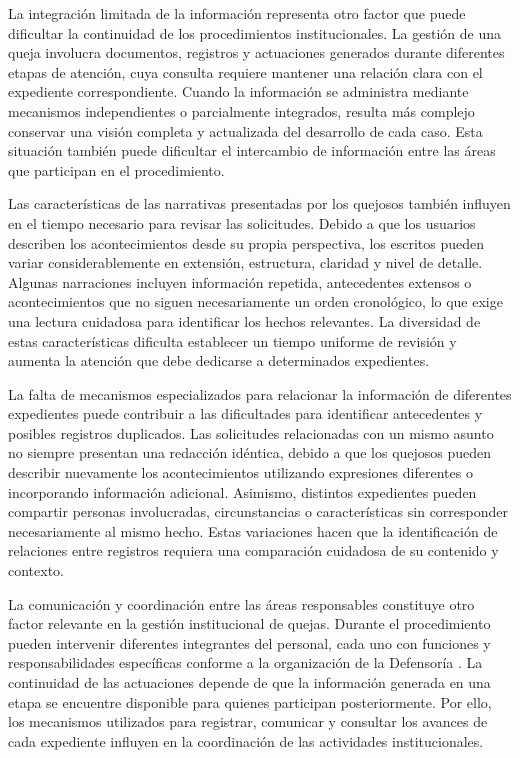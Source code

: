 	La integración limitada de la información representa otro factor que puede dificultar la continuidad de los procedimientos institucionales. La gestión de una queja involucra documentos, registros y actuaciones generados durante diferentes etapas de atención, cuya consulta requiere mantener una relación clara con el expediente correspondiente. Cuando la información se administra mediante mecanismos independientes o parcialmente integrados, resulta más complejo conservar una visión completa y actualizada del desarrollo de cada caso. Esta situación también puede dificultar el intercambio de información entre las áreas que participan en el procedimiento.

	Las características de las narrativas presentadas por los quejosos también influyen en el tiempo necesario para revisar las solicitudes. Debido a que los usuarios describen los acontecimientos desde su propia perspectiva, los escritos pueden variar considerablemente en extensión, estructura, claridad y nivel de detalle. Algunas narraciones incluyen información repetida, antecedentes extensos o acontecimientos que no siguen necesariamente un orden cronológico, lo que exige una lectura cuidadosa para identificar los hechos relevantes. La diversidad de estas características dificulta establecer un tiempo uniforme de revisión y aumenta la atención que debe dedicarse a determinados expedientes.

	La falta de mecanismos especializados para relacionar la información de diferentes expedientes puede contribuir a las dificultades para identificar antecedentes y posibles registros duplicados. Las solicitudes relacionadas con un mismo asunto no siempre presentan una redacción idéntica, debido a que los quejosos pueden describir nuevamente los acontecimientos utilizando expresiones diferentes o incorporando información adicional. Asimismo, distintos expedientes pueden compartir personas involucradas, circunstancias o características sin corresponder necesariamente al mismo hecho. Estas variaciones hacen que la identificación de relaciones entre registros requiera una comparación cuidadosa de su contenido y contexto.

	La comunicación y coordinación entre las áreas responsables constituye otro factor relevante en la gestión institucional de quejas. Durante el procedimiento pueden intervenir diferentes integrantes del personal, cada uno con funciones y responsabilidades específicas conforme a la organización de la Defensoría \cite{ipn_manual_organizacion_ddp}. La continuidad de las actuaciones depende de que la información generada en una etapa se encuentre disponible para quienes participan posteriormente. Por ello, los mecanismos utilizados para registrar, comunicar y consultar los avances de cada expediente influyen en la coordinación de las actividades institucionales.

